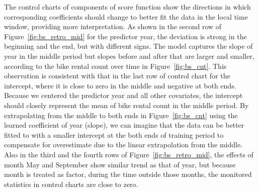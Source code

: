 \documentclass[twoside,11pt]{article}
\begin{document}
The control charts of components of score function show the directions in which corresponding coefficients should change to better fit the data in the local time window, providing more interpretation. As shown in the second row of Figure~\ref{fig:bs_retro_mid} for the predictor year, the deviation is strong in the beginning and the end, but with different signs. The model captures the slope of year in the middle period but slopes before and after that are larger and smaller, according to the bike rental count over time in Figure~\ref{fig:bs_cnt}. This observation is consistent with that in the last row of control chart for the intercept, where it is close to zero in the middle and negative at both ends. Because we centered the predictor year and all other covariates, the intercept should closely represent the mean of bike rental count in the middle period. By extrapolating from the middle to both ends in Figure~\ref{fig:bs_cnt} using the learned coefficient of year (slope), we can imagine that the data can be better fitted to with a smaller intercept at the both ends of training period to compensate for overestimate due to the linear extrapolation from the middle. Also in the third and the fourth rows of Figure~\ref{fig:bs_retro_mid}, the effects of month May and September show similar trend as that of year, but because month is treated as factor, during the time outside those months, the monitored statistics in control charts are close to zero.
\end{document}
